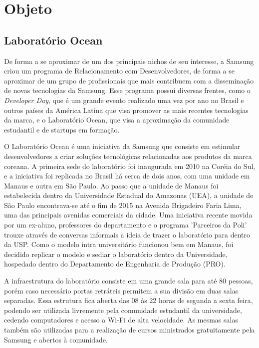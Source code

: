 \chapter{Objeto}
\section{Laboratório Ocean}

De forma a se aproximar de um dos principais nichos de seu interesse, a Samsung criou um programa de Relacionamento com Desenvolvedores, de forma a se aproximar de um grupo de profissionais que mais contribuem com a disseminação de novas tecnologias da Samsung. Esse programa possui diversas frentes, como o \textit{Developer Day}, que é um grande evento realizado uma vez por ano no Brasil e outros países da América Latina que visa promover as mais recentes tecnologias da marca, e o Laboratório Ocean, que visa a aproximação da comunidade estudantil e de startups em formação.

O Laboratório Ocean é uma iniciativa da Samsung que consiste em estimular desenvolvedores a criar soluções tecnológicas relacionadas aos produtos da marca coreana. A primeira sede do laboratório foi inaugurada em 2010 na Coréia do Sul, e a iniciativa foi replicada no Brasil há cerca de dois anos, com uma unidade em Manaus e outra em São Paulo. Ao passo que a unidade de Manaus foi estabelecida dentro da Universidade Estadual do Amazonas (UEA), a unidade de São Paulo encontrava-se até o fim de 2015 na Avenida Brigadeiro Faria Lima, uma das principais avenidas comerciais da cidade. Uma iniciativa recente movida por um ex-aluno, professores do departamento e o programa 'Parceiros da Poli' trouxe através de conversas informais a ideia de trazer o laboratório para dentro da USP. Como o modelo intra universitário funcionou bem em Manaus, foi decidido replicar o modelo e sediar o laboratório dentro da Universidade, hospedado dentro do Departamento de Engenharia de Produção (PRO).

A infraestrutura do laboratório consiste em uma grande sala para até 80 pessoas, porém caso necessário portas retráteis permitem a sua divisão em duas salas separadas. Essa estrutura fica aberta das 08 às 22 horas de segunda a sexta feira, podendo ser utilizada livremente pela comunidade estudantil da universidade, cedendo computadores e acesso a Wi-Fi de alta velocidade. As mesmas salas também são utilizadas para a realização de cursos ministrados gratuitamente pela Samsung e abertos à comunidade.

